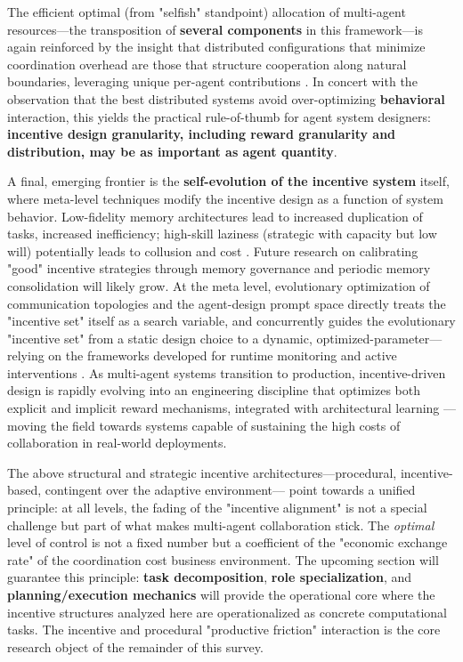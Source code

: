 \documentclass[11pt,a4paper]{article}
\begin{document}
The efficient optimal (from "selfish" standpoint) allocation of multi-agent resources---the transposition of \textbf{several components} in this framework---is again reinforced by the insight that distributed configurations that minimize coordination overhead are those that structure cooperation along natural boundaries, leveraging unique per-agent contributions \cite{arxiv:2506.06843v3}. In concert with the observation that the best distributed systems avoid over-optimizing \textbf{behavioral} interaction, this yields the practical rule-of-thumb for agent system designers: \textbf{incentive design granularity, including reward granularity and distribution, may be as important as agent quantity}.

A final, emerging frontier is the \textbf{self-evolution of the incentive system} itself, where meta-level techniques modify the incentive design as a function of system behavior. Low-fidelity memory architectures lead to increased duplication of tasks, increased inefficiency; high-skill laziness (strategic with capacity but low will) potentially leads to collusion and cost \cite{arxiv:2601.04748v2}. Future research on calibrating "good" incentive strategies through memory governance and periodic memory consolidation \cite{arxiv:2505.16067v2} will likely grow. At the meta level, evolutionary optimization of communication topologies and the agent-design prompt space \cite{arxiv:2502.02533v2,arxiv:2502.04180v2} directly treats the "incentive set" itself as a search variable, and concurrently guides the evolutionary "incentive set" from a static design choice to a dynamic, optimized-parameter---relying on the frameworks developed for runtime monitoring and active interventions \cite{arxiv:2503.16416v2}. As multi-agent systems transition to production, incentive-driven design is rapidly evolving into an engineering discipline that optimizes both explicit and implicit reward mechanisms, integrated with architectural learning \cite{arxiv:2503.09501v3,arxiv:2603.15125v3}---moving the field towards systems capable of sustaining the high costs of collaboration in real-world deployments.

The above structural and strategic incentive architectures---procedural, incentive-based, contingent over the adaptive environment--- point towards a unified principle: at all levels, the fading of the "incentive alignment" is not a special challenge but part of what makes multi-agent collaboration stick. The \emph{optimal} level of control is not a fixed number but a coefficient of the "economic exchange rate" of the coordination cost business environment. The upcoming section will guarantee this principle: \textbf{task decomposition}, \textbf{role specialization}, and \textbf{planning/execution mechanics} will provide the operational core where the incentive structures analyzed here are operationalized as concrete computational tasks. The incentive and procedural "productive friction" interaction is the core research object of the remainder of this survey.
\end{document}
